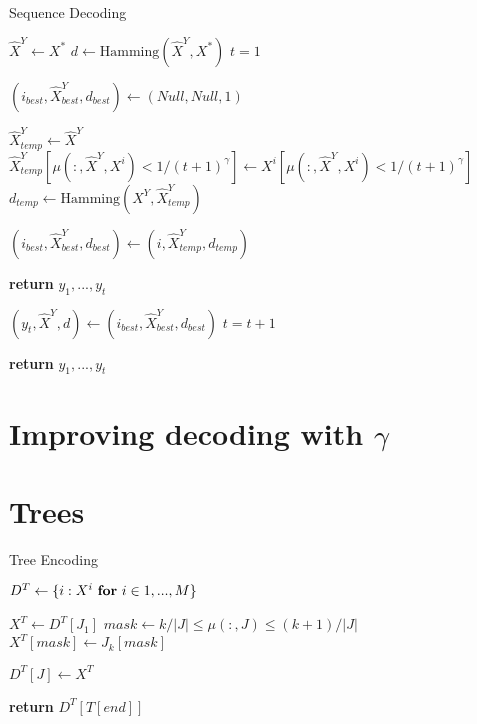 \documentclass{article}
\begin{document}
\begin{algorithm}
\caption{Sequence Decoding}

\begin{algorithmic}[0]
\State $\hat{X}^Y \gets X^*$
\State $d \gets \textrm{Hamming}(\hat{X}^Y , X^*)$
\State $t = 1$


\State $(i_{best}, \hat{X}^Y_{best}, d_{best}) \gets (Null, Null, 1)$

    
        \State $\hat{X}^Y_{temp} \gets \hat{X}^Y $
        \State $\hat{X}^Y_{temp}[\mu(:, \hat{X}^Y, X^i) < 1/(t+1)^\gamma] \gets X^i[\mu(:, \hat{X}^Y, X^i) < 1/(t+1)^\gamma]$
        \State $d_{temp} \gets \textrm{Hamming}(X^Y, \hat{X}^Y_{temp})$
        
            
            \State $(i_{best}, \hat{X}^Y_{best}, d_{best}) \gets (i, \hat{X}^Y_{temp}, d_{temp})$
            
        \EndIf
    \EndFor
    
    
        \State \textbf{return} $y_1, ..., y_t$
        
    \Else
    
        \State $(y_t, \hat{X}^Y, d) \gets (i_{best}, \hat{X}^Y_{best}, d_{best})$
        \State $t = t+1$
        
    \EndIf

\EndWhile

\State \textbf{return} $y_1, ..., y_t$
\EndFunction

\end{algorithmic}
\end{algorithm}

\section{Improving decoding with $\gamma$}

\section{Trees}

\begin{algorithm}
\caption{Tree Encoding}

\begin{algorithmic}[0]

\State $D^T \gets \{i: X^i \textrm{ \textbf{for} } i \in 1, ..., M\}$


    \State $X^T \gets D^T[J_1]$
        \State $mask \gets k/|J| \leq \mu(:, J) \leq (k+1)/|J|$
        \State $X^T[mask] \gets J_k[mask]$
    \EndFor
    
    \State $D^T[J] \gets X^T$
\EndFor

\State \textbf{return} $D^T[T[end]]$
\EndFunction

\end{algorithmic}
\end{algorithm}
\end{document}
